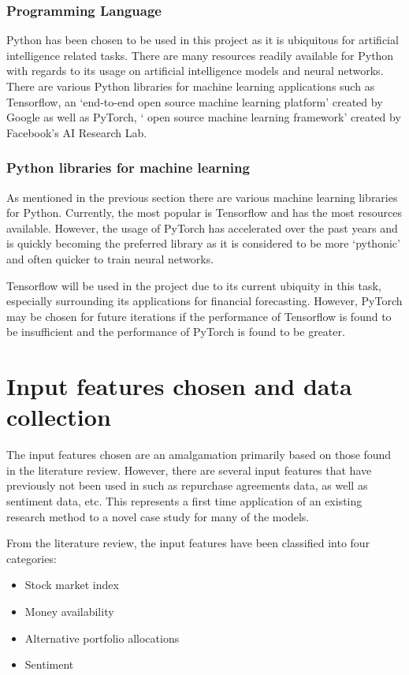 \subsubsection{Programming Language}
Python has been chosen to be used in this project as it is ubiquitous for artificial intelligence related
tasks. There are many resources readily available for Python with regards to its usage on artificial
intelligence models and neural networks. There are various Python libraries for machine learning applications
such as Tensorflow, an `end-to-end open source machine learning platform' created by Google as well as
PyTorch, ` open source machine learning framework' created by Facebook's AI Research Lab.

\subsubsection{Python libraries for machine learning}
As mentioned in the previous section there are various machine learning libraries for Python. Currently, the
most popular is Tensorflow and has the most resources available.
However, the usage of PyTorch has accelerated over the past years and is quickly becoming the preferred
library as it is considered to be more `pythonic' and often quicker to train neural networks.

Tensorflow will be used in the project due to its current ubiquity in this task, especially surrounding
its applications for financial forecasting. However, PyTorch may be chosen for future iterations if
the performance of Tensorflow is found to be insufficient and the performance of PyTorch is found to be
greater.

\section{Input features chosen and data collection}
The input features chosen are an amalgamation primarily based on those found in the literature review.
However, there are several input features that have previously not been used in such as repurchase agreements
data, as well as sentiment data, etc. This represents a first time application of an existing research method
to a novel case study for many of the models.

From the literature review, the input features have been classified into four categories:
\begin{itemize}
    \item Stock market index
    \item Money availability
    \item Alternative portfolio allocations
    \item Sentiment
\end{itemize}

